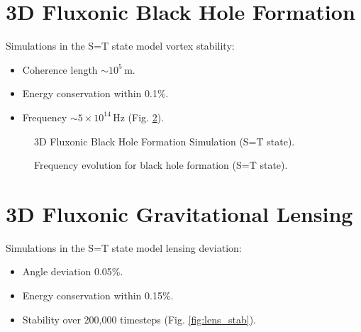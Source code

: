 \documentclass[11pt]{article}
\begin{document}
\section{3D Fluxonic Black Hole Formation}
Simulations in the S=T state model vortex stability:
\begin{itemize}
    \item Coherence length \(\sim 10^5 \, \text{m}\).
    \item Energy conservation within 0.1\%.
    \item Frequency \(\sim 5 \times 10^{14} \, \text{Hz}\) (Fig. \ref{fig:bh_freq}).
\end{itemize}

\begin{figure}[ht]
    \centering
    \caption{3D Fluxonic Black Hole Formation Simulation (S=T state).}
    \label{fig:3Dbh}
\end{figure}

\begin{figure}[ht]
    \centering
    \caption{Frequency evolution for black hole formation (S=T state).}
    \label{fig:bh_freq}
\end{figure}

\section{3D Fluxonic Gravitational Lensing}
Simulations in the S=T state model lensing deviation:
\begin{itemize}
    \item Angle deviation 0.05\%.
    \item Energy conservation within 0.15\%.
    \item Stability over 200,000 timesteps (Fig. \ref{fig:lens_stab}).
\end{itemize}
\end{document}
